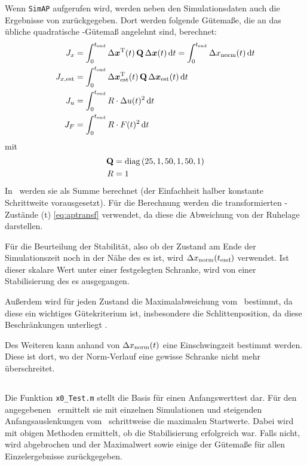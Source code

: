 Wenn \texttt{SimAP} aufgerufen wird, werden neben den Simulationsdaten auch die Ergebnisse von  zurückgegeben.
Dort werden \ua folgende Gütemaße, die an das übliche quadratische \ricc-Gütemaß angelehnt sind, berechnet:
\begin{subequations} \begin{align} 
	J_x &= \int_{0}^{t_{\mathrm{end}}} \Delta \boldsymbol{x}^{\mathrm{T}}(t) \, {\boldsymbol{\mathrm{Q}}} \, \Delta \boldsymbol{x}(t)  \, \mathrm{d} t = \int_{0}^{t_{\mathrm{end}}} \Delta x_{\mathrm{norm}}(t)  \, \mathrm{d} t  \\
	J_{x,\mathrm{est}} &= \int_{0}^{t_{\mathrm{end}}} \Delta \boldsymbol{x}_{\mathrm{est}}^{\mathrm{T}}(t)  \,{\boldsymbol{\mathrm{Q}}}  \,\Delta \boldsymbol{x}_{\mathrm{est}}(t)  \, \mathrm{d} t  \\
	J_u &= \int_{0}^{t_{\mathrm{end}}}  R \cdot \Delta u(t)^2 \, \mathrm{d} t	\\
	J_F &= \int_{0}^{t_{\mathrm{end}}}  R \cdot F(t)^2 \, \mathrm{d} t
\end{align} \end{subequations}
mit
\begin{align*}
	{\ensuremath{\boldsymbol{\mathrm{Q}}}} &= \mathrm{diag}\left(25, 1, 50, 1, 50, 1 \right) \\
	R &= 1 
\end{align*}
In \ml\ werden sie als Summe berechnet (der Einfachheit halber konstante Schrittweite vorausgesetzt).
Für die Berechnung werden die transformierten \ap-Zustände \dvex(t) \eqref{eq:aptransf} verwendet, da diese die Abweichung von der Ruhelage darstellen.

Für die Beurteilung der Stabilität, also ob der Zustand am Ende der Simulationszeit noch in der Nähe des \ap es ist, wird
$\Delta x_{\mathrm{norm}}(t_{\mathrm{end}})$
verwendet. Ist dieser skalare Wert unter einer festgelegten Schranke, wird von einer Stabilisierung des \ap es ausgegangen.

Außerdem wird für jeden Zustand die Maximalabweichung vom \ap\ bestimmt, da diese ein wichtiges Gütekriterium ist, insbesondere die Schlittenposition, da diese Beschränkungen unterliegt .

Des Weiteren kann anhand von $\Delta x_{\mathrm{norm}}(t)$ eine Einschwingzeit bestimmt werden.
Diese ist dort, wo der Norm-Verlauf eine gewisse Schranke nicht mehr überschreitet.


\subsection{\xots}\label{subsec:awts}

Die Funktion \texttt{x0\_Test.m} stellt die Basis für einen Anfangswerttest dar.
Für den angegebenen \ap\ ermittelt sie mit einzelnen Simulationen und steigenden Anfangsauslenkungen vom \ap\ schrittweise die maximalen Startwerte.
Dabei wird mit obigen Methoden ermittelt, ob die Stabilisierung erfolgreich war.
Falls nicht, wird abgebrochen und der Maximalwert sowie einige der Gütemaße für allen Einzelergebnisse zurückgegeben.


